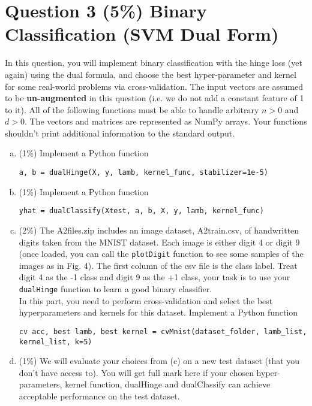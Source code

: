 \documentclass[12pt]{article}
\newcounter{ques}
\begin{document}
\section*{Question 3 (5\%) Binary Classification (SVM Dual Form)}
In this question, you will implement binary classification with the hinge loss (yet again) using the dual formula, and choose the best hyper-parameter and kernel for some real-world problems via cross-validation.
The input vectors are assumed to be \textbf{un-augmented} in this question (i.e. we do not add a constant feature of 1 to it). All of the following functions must be able to handle arbitrary $n > 0$ and $d > 0$. The vectors and matrices are represented as NumPy arrays. Your functions shouldn't print additional information to the
standard output.
\begin{enumerate}[(a)]
  \item (1\%) Implement a Python function
  \begin{center}
    \texttt{a, b = dualHinge(X, y, lamb, kernel\_func, stabilizer=1e-5)}
  \end{center}
  \item (1\%) Implement a Python function
  \begin{center}
    \texttt{yhat = dualClassify(Xtest, a, b, X, y, lamb, kernel\_func)}
  \end{center}
  \item (2\%) The A2files.zip includes an image dataset, A2train.csv, of handwritten digits taken from the MNIST dataset. Each image is either digit 4 or digit 9 (once loaded, you can call the \texttt{plotDigit} function to see some samples of the images as in Fig. 4). The first column of the csv file is the class label. Treat digit 4 as the -1 class and digit 9 as the +1 class, your task is to use your \texttt{dualHinge} function to learn a good binary classifier.\\
  In this part, you need to perform cross-validation and select the best hyperparameters and kernels for this dataset. Implement a Python function
  \begin{center}
    \texttt{cv acc, best lamb, best kernel = cvMnist(dataset\_folder, lamb\_list, kernel\_list, k=5)}
  \end{center}
  \item (1\%) We will evaluate your choices from (c) on a new test dataset (that you don’t have access to). You will get full mark here if your chosen hyper-parameters, kernel function, dualHinge and dualClassify can achieve acceptable performance on the test dataset.
\end{enumerate}
\end{document}
